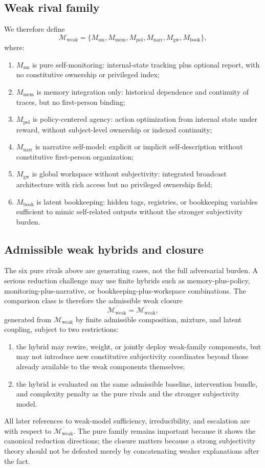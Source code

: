 \documentclass[11pt,a4paper]{article}
\theoremstyle{definition}
\newcommand{\WeakFam}{\mathcal{M}_{\mathrm{weak}}}
\newcommand{\WeakClosure}{\overline{\WeakFam}}
\begin{document}
\subsection{Weak rival family}
We therefore define
\[
\WeakFam=\{M_{\mathrm{sm}},M_{\mathrm{mem}},M_{\mathrm{pol}},M_{\mathrm{narr}},M_{\mathrm{gw}},M_{\mathrm{book}}\},
\]
where:
\begin{enumerate}[leftmargin=1.5em]
\item $M_{\mathrm{sm}}$ is pure self-monitoring: internal-state tracking plus optional report, with no constitutive ownership or privileged index;
\item $M_{\mathrm{mem}}$ is memory integration only: historical dependence and continuity of traces, but no first-person binding;
\item $M_{\mathrm{pol}}$ is policy-centered agency: action optimization from internal state under reward, without subject-level ownership or indexed continuity;
\item $M_{\mathrm{narr}}$ is narrative self-model: explicit or implicit self-description without constitutive first-person organization;
\item $M_{\mathrm{gw}}$ is global workspace without subjectivity: integrated broadcast architecture with rich access but no privileged ownership field;
\item $M_{\mathrm{book}}$ is latent bookkeeping: hidden tags, registries, or bookkeeping variables sufficient to mimic self-related outputs without the stronger subjectivity burden.
\end{enumerate}

\subsection{Admissible weak hybrids and closure}
The six pure rivals above are generating cases, not the full adversarial burden. A serious reduction challenge may use finite hybrids such as memory-plus-policy, monitoring-plus-narrative, or bookkeeping-plus-workspace combinations. The comparison class is therefore the admissible weak closure
\[
\WeakClosure=\overline{\WeakFam},
\]
generated from $\WeakFam$ by finite admissible composition, mixture, and latent coupling, subject to two restrictions:
\begin{enumerate}[leftmargin=1.5em]
\item the hybrid may rewire, weight, or jointly deploy weak-family components, but may not introduce new constitutive subjectivity coordinates beyond those already available to the weak components themselves;
\item the hybrid is evaluated on the same admissible baseline, intervention bundle, and complexity penalty as the pure rivals and the stronger subjectivity model.
\end{enumerate}
All later references to weak-model sufficiency, irreducibility, and escalation are with respect to $\WeakClosure$. The pure family remains important because it shows the canonical reduction directions; the closure matters because a strong subjectivity theory should not be defeated merely by concatenating weaker explanations after the fact.
\end{document}
